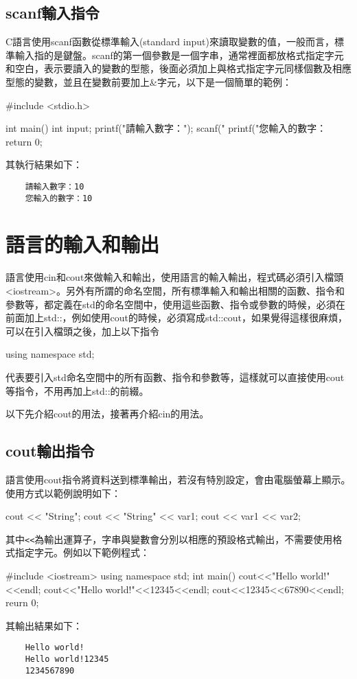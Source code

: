 \subsection {scanf輸入指令}
C語言使用scanf函數從標準輸入(standard input)來讀取變數的值，一般而言，標準輸入指的是鍵盤。scanf的第一個參數是一個字串，通常裡面都放格式指定字元和空白，表示要讀入的變數的型態，後面必須加上與格式指定字元同樣個數及相應型態的變數，並且在變數前要加上\&字元，以下是一個簡單的範例：
\begin{cppcode}
#include <stdio.h>

int main() {
	int input;
	printf("請輸入數字：");
	scanf("%
	printf("您輸入的數字：%
	return 0;
}
\end{cppcode}
其執行結果如下：
\begin{Verbatim}
    請輸入數字：10
    您輸入的數字：10
\end{Verbatim}


\section{\cc{}語言的輸入和輸出}
\cc{}語言使用cin和cout來做輸入和輸出，使用\cc{}語言的輸入輸出，程式碼必須引入檔頭<iostream>。另外\cc{}有所謂的命名空間，所有標準輸入和輸出相關的函數、指令和參數等，都定義在std的命名空間中，使用這些函數、指令或參數的時候，必須在前面加上std::，例如使用cout的時候，必須寫成std::cout，如果覺得這樣很麻煩，可以在引入檔頭之後，加上以下指令
\begin{inside}
	using namespace std;
\end{inside}
代表要引入std命名空間中的所有函數、指令和參數等，這樣就可以直接使用cout等指令，不用再加上std::的前綴。

以下先介紹cout的用法，接著再介紹cin的用法。

\subsection{cout輸出指令}
\cc{}語言使用cout指令將資料送到標準輸出，若沒有特別設定，會由電腦螢幕上顯示。使用方式以範例說明如下：
\begin{inside}
	cout << "String";
	cout << "String" << var1;
	cout << var1 << var2;
\end{inside}
其中\texttt{<<}為輸出運算子，字串與變數會分別以相應的預設格式輸出，不需要使用格式指定字元。例如以下範例程式：
 \begin{cppcode}
 	#include <iostream>
 	using namespace std;
 	int main()
 	{
 		cout<<"Hello world!"<<endl;
 	    cout<<"Hello world!"<<12345<<endl;
 		cout<<12345<<67890<<endl;
 		reurn 0;
 	}
 \end{cppcode}
其輸出結果如下：
\begin{Verbatim}
    Hello world!
    Hello world!12345
    1234567890
\end{Verbatim}

